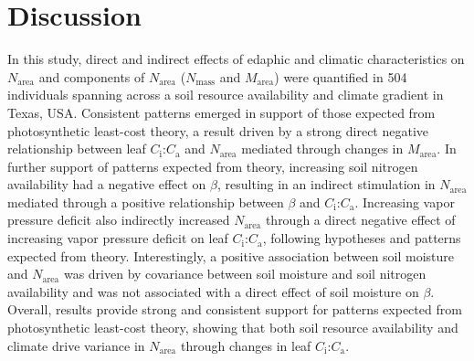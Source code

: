 \section{Discussion}
\noindent In this study, direct and indirect effects of edaphic and climatic characteristics on $N_\mathrm{area}$ and components of $N_\mathrm{area}$ ($N_\mathrm{mass}$ and $M_\mathrm{area}$) were quantified in 504 individuals spanning across a soil resource availability and climate gradient in Texas, USA. Consistent patterns emerged in support of those expected from photosynthetic least-cost theory, a result driven by a strong direct negative relationship between leaf $C_\mathrm{i}$:$C_\mathrm{a}$ and $N_\mathrm{area}$ mediated through changes in $M_\mathrm{area}$. In further support of patterns expected from theory, increasing soil nitrogen availability had a negative effect on $\beta$, resulting in an indirect stimulation in $N_\mathrm{area}$ mediated through a positive relationship between $\beta$ and $C_\mathrm{i}$:$C_\mathrm{a}$. Increasing vapor pressure deficit also indirectly increased $N_\mathrm{area}$ through a direct negative effect of increasing vapor pressure deficit on leaf $C_\mathrm{i}$:$C_\mathrm{a}$, following hypotheses and patterns expected from theory. Interestingly, a positive association between soil moisture and $N_\mathrm{area}$ was driven by covariance between soil moisture and soil nitrogen availability and was not associated with a direct effect of soil moisture on $\beta$. Overall, results provide strong and consistent support for patterns expected from photosynthetic least-cost theory, showing that both soil resource availability and climate drive variance in $N_\mathrm{area}$ through changes in leaf $C_\mathrm{i}$:$C_\mathrm{a}$.

